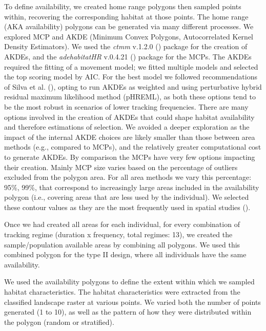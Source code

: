 \documentclass[10pt,a4paper]{article}
\begin{document}
To define availability, we created home range polygons then sampled points within, recovering the corresponding habitat at those points.
The home range (AKA availability) polygons can be generated via many different processes.
We explored MCP and AKDE (Minimum Convex Polygons, Autocorrelated Kernel Density Estimators).
We used the \emph{ctmm} v.1.2.0 () package for the creation of AKDEs, and the \emph{adehabitatHR} v.0.4.21 () package for the MCPs.
The AKDEs required the fitting of a movement model; we fitted multiple models and selected the top scoring model by AIC.
For the best model we followed recommendations of Silva et al. (), opting to run AKDEs as weighted and using perturbative hybrid residual maximum likelihood method (pHREML), as both these options tend to be the most robust in scenarios of lower tracking frequencies.
There are many options involved in the creation of AKDEs that could shape habitat availability and therefore estimations of selection.
We avoided a deeper exploration as the impact of the internal AKDE choices are likely smaller than those between area methods (e.g., compared to MCPs), and the relatively greater computational cost to generate AKDEs.
By comparison the MCPs have very few options impacting their creation.
Mainly MCP size varies based on the percentage of outliers excluded from the polygon area.
For all area methods we vary this percentage: 95\%, 99\%, that correspond to increasingly large areas included in the availability polygon (i.e., covering areas that are less used by the individual).
We selected these contour values as they are the most frequently used in spatial studies ().

Once we had created all areas for each individual, for every combination of tracking regime (duration x frequency, total regimes: 13), we created the sample/population available areas by combining all polygons.
We used this combined polygon for the type II design, where all individuals have the same availability.

We used the availability polygons to define the extent within which we sampled habitat characteristics.
The habitat characteristics were extracted from the classified landscape raster at various points.
We varied both the number of points generated (1 to 10), as well as the pattern of how they were distributed within the polygon (random or stratified).
\end{document}

